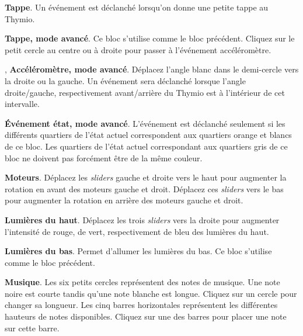 \bigskip\bigskip\bigskip

 \textbf{Tappe}. Un événement est déclanché lorsqu'on donne une petite tappe au Thymio.

\bigskip\bigskip\bigskip

 \textbf{Tappe, mode avancé}.
Ce bloc s'utilise comme le bloc précédent.
Cliquez sur le petit cercle au centre ou à droite pour passer à l'événement accéléromètre.

\bigskip\bigskip

,  \textbf{Accéléromètre, mode avancé}.
Déplacez l'angle blanc dans le demi-cercle vers la droite ou la gauche.
Un événement sera déclanché lorsque l'angle droite/gauche, respectivement avant/arrière 
du Thymio est à l'intérieur de cet intervalle.

\bigskip\bigskip\bigskip\bigskip

 \textbf{Événement état, mode avancé}.
L'événement est déclanché seulement si les différents quartiers de l'état actuel
correspondent aux quartiers orange et blancs de ce bloc.
Les quartiers de l'état actuel correspondant aux quartiers gris de ce bloc ne doivent pas forcément
être de la même couleur.

\bigskip


 \textbf{Moteurs}.
Déplacez les \emph{sliders} gauche et droite vers le haut pour augmenter la rotation en avant des
moteurs gauche et droit.
Déplacez ces \emph{sliders} vers le bas pour augmenter la rotation en arrière des moteurs
gauche et droit.

\bigskip\bigskip

 \textbf{Lumières du haut}.
Déplacez les trois \emph{sliders} vers la droite pour augmenter l'intensité de rouge, de vert,
respectivement de bleu des lumières du haut.

\bigskip\bigskip

 \textbf{Lumières du bas}.
Permet d'allumer les lumières du bas. Ce bloc s'utilise comme le bloc précédent.

\bigskip\bigskip\bigskip\bigskip

 \textbf{Musique}.
Les six petits cercles représentent des notes de musique.
Une note noire est courte tandis qu'une note blanche est longue.
Cliquez sur un cercle pour changer sa longueur.
Les cinq barres horizontales représentent les différentes hauteurs de notes disponibles.
Cliquez sur une des barres pour placer une note sur cette barre.

